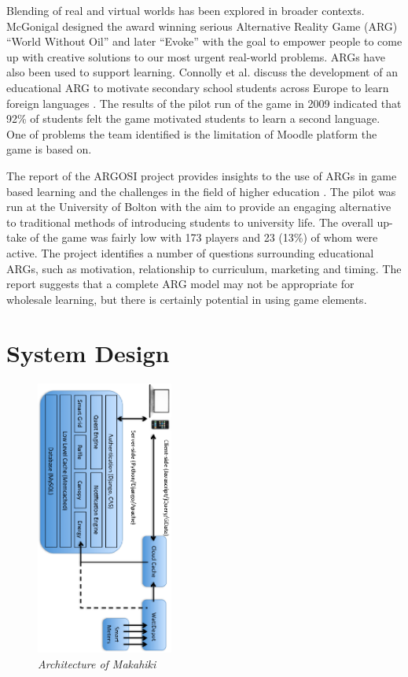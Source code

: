 \documentclass{acm_proc_article-sp}
\begin{document}
Blending of real and virtual worlds has been explored in broader contexts.
McGonigal designed the award winning serious Alternative Reality Game (ARG)
``World Without Oil'' \cite{worldwithoutoil} and later ``Evoke''
\cite{urgentevoke} with the goal to empower people to come up with creative
solutions to our most urgent real-world problems. ARGs have also been used to
support learning. Connolly et al. discuss the development of an educational ARG
to motivate secondary school students across Europe to learn foreign languages
\cite{connolly2009arguing}. The results of the pilot run of the game in 2009
indicated that 92\% of students felt the game motivated students to learn a
second language. One of problems the team identified is the limitation of
Moodle platform the game is based on.

The report of the ARGOSI project provides insights to the use of ARGs in game
based learning and the challenges in the field of higher education
\cite{whitton2009alternate}. The pilot was run at the University of Bolton with 
the aim to provide an engaging alternative to traditional methods of 
introducing students to university life. The overall up-take of the game was 
fairly low with 173 players and 23 (13\%) of whom were active. The project
identifies a number of questions surrounding educational ARGs, such as 
motivation, relationship to curriculum, marketing and timing. The report 
suggests that a complete ARG model may not be appropriate for wholesale
learning, but there is certainly potential in using game elements.

\section{System Design}
\begin{figure}[t!]
  \center
  \includegraphics[width=0.4\textwidth, angle=90]{makahiki-architecture.eps}
  \caption{\em \small Architecture of Makahiki}
  \label{fig:MakahikiArchitecture}
\end{figure}
\end{document}
